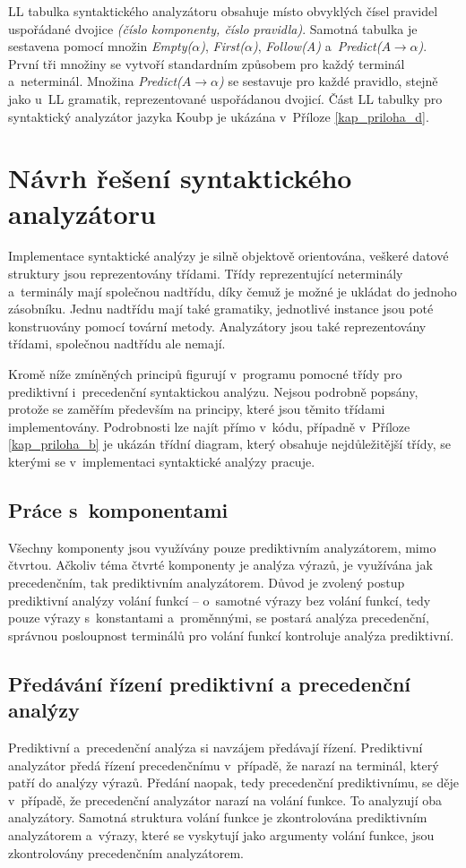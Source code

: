 LL tabulka syntaktického analyzátoru obsahuje místo obvyklých čísel pravidel uspořádané dvojice \emph{(číslo komponenty, číslo pravidla)}.
Samotná tabulka je sestavena pomocí množin \emph{Empty($\alpha$)}, \emph{First($\alpha$)}, \emph{Follow(A)} a~\emph{Predict($A \rightarrow \alpha$)}.
První tři množiny se vytvoří standardním způsobem pro každý terminál a~neterminál.
Množina \emph{Predict($A \rightarrow \alpha$)} se sestavuje pro každé pravidlo, stejně jako u~LL gramatik, reprezentované uspořádanou dvojicí.
Část LL tabulky pro syntaktický analyzátor jazyka Koubp je ukázána v~Příloze \ref{kap_priloha_d}.

\section{Návrh řešení syntaktického analyzátoru}\label{kap_reseni_sa}
Implementace syntaktické analýzy je silně objektově orientována, veškeré datové struktury jsou reprezentovány třídami.
Třídy reprezentující neterminály a~terminály mají společnou nadtřídu, díky čemuž je možné je ukládat do jednoho zásobníku.
Jednu nadtřídu mají také gramatiky, jednotlivé instance jsou poté konstruovány pomocí tovární metody.
Analyzátory jsou také reprezentovány třídami, společnou nadtřídu ale nemají.

Kromě níže zmíněných principů figurují v~programu pomocné třídy pro prediktivní i~precedenční syntaktickou analýzu.
Nejsou podrobně popsány, protože se zaměřím především na principy, které jsou těmito třídami implementovány.
Podrobnosti lze najít přímo v~kódu, případně v~Příloze \ref{kap_priloha_b} je ukázán třídní diagram, který obsahuje nejdůležitější třídy, se kterými se v~implementaci syntaktické analýzy pracuje.

\subsection*{Práce s~komponentami}
Všechny komponenty jsou využívány pouze prediktivním analyzátorem, mimo čtvrtou.
Ačkoliv téma čtvrté komponenty je analýza výrazů, je využívána jak precedenčním, tak prediktivním analyzátorem.
Důvod je zvolený postup prediktivní analýzy volání funkcí -- o~samotné výrazy bez volání funkcí, tedy pouze výrazy s~konstantami a~proměnnými, se postará analýza precedenční, správnou posloupnost terminálů pro volání funkcí kontroluje analýza prediktivní.


\subsection*{Předávání řízení prediktivní a precedenční analýzy}
Prediktivní a~precedenční analýza si navzájem předávají řízení.
Prediktivní analyzátor předá řízení precedenčnímu v~případě, že narazí na terminál, který patří do analýzy výrazů.
Předání naopak, tedy precedenční prediktivnímu, se děje v~případě, že precedenční analyzátor narazí na volání funkce.
To analyzují oba analyzátory.
Samotná struktura volání funkce je zkontrolována prediktivním analyzátorem a~výrazy, které se vyskytují jako argumenty volání funkce, jsou zkontrolovány precedenčním analyzátorem.

